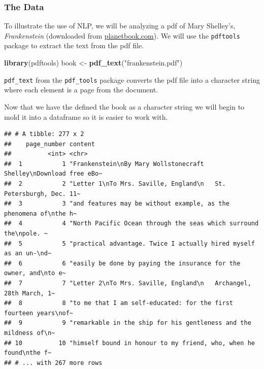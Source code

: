 \documentclass[]{article}
\newenvironment{Shaded}{\begin{snugshade}}{\end{snugshade}}
\newcommand{\KeywordTok}[1]{\textcolor[rgb]{0.13,0.29,0.53}{\textbf{#1}}}
\newcommand{\NormalTok}[1]{#1}
\newcommand{\OperatorTok}[1]{\textcolor[rgb]{0.81,0.36,0.00}{\textbf{#1}}}
\newcommand{\StringTok}[1]{\textcolor[rgb]{0.31,0.60,0.02}{#1}}
\begin{document}
\hypertarget{the-data}{%
\subsubsection{The Data}\label{the-data}}

To illustrate the use of NLP, we will be analyzing a pdf of Mary
Shelley's, \emph{Frankenstein} (downloaded from
\href{https://www.planetebook.com/free-ebooks/frankenstein.pdf}{planetbook.com}).
We will use the \texttt{pdftools} package to extract the text from the
pdf file.

\begin{Shaded}
\begin{Highlighting}[]
\KeywordTok{library}\NormalTok{(pdftools)}
\NormalTok{book <-}\StringTok{ }\KeywordTok{pdf_text}\NormalTok{(}\StringTok{"frankenstein.pdf"}\NormalTok{)}
\end{Highlighting}
\end{Shaded}

\texttt{pdf\_text} from the \texttt{pdf\_tools} package converts the pdf
file into a character string where each element is a page from the
document.

Now that we have the defined the book as a character string we will
begin to mold it into a dataframe so it is easier to work with.

\begin{Shaded}
\end{Shaded}

\begin{verbatim}
## # A tibble: 277 x 2
##    page_number content                                                          
##          <int> <chr>                                                            
##  1           1 "Frankenstein\nBy Mary Wollstonecraft Shelley\nDownload free eBo~
##  2           2 "Letter 1\nTo Mrs. Saville, England\n   St. Petersburgh, Dec. 11~
##  3           3 "and features may be without example, as the phenomena of\nthe h~
##  4           4 "North Pacific Ocean through the seas which surround the\npole. ~
##  5           5 "practical advantage. Twice I actually hired myself as an un-\nd~
##  6           6 "easily be done by paying the insurance for the owner, and\nto e~
##  7           7 "Letter 2\nTo Mrs. Saville, England\n   Archangel, 28th March, 1~
##  8           8 "to me that I am self-educated: for the first fourteen years\nof~
##  9           9 "remarkable in the ship for his gentleness and the mildness of\n~
## 10          10 "himself bound in honour to my friend, who, when he found\nthe f~
## # ... with 267 more rows
\end{verbatim}
\end{document}
